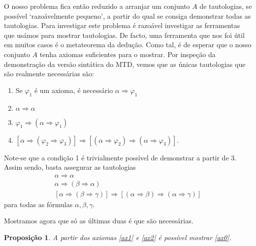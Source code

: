 \documentclass{report}
\newtheorem{prop}{Proposição}
\theoremstyle{definition}
\theoremstyle{remark}
\newcommand{\imply}{\mathbin{\Rightarrow}}
\begin{document}
	O nosso problema fica então reduzido a arranjar um conjunto $A$ de tautologias, se possível `razoávelmente pequeno', a partir do qual se consiga demonstrar todas as tautologias. Para investigar este problema é razoável investigar as ferramentas que usámos para mostrar tautologias. De facto, uma ferramenta que nos foi útil em muitos casos é o metateorema da dedução. Como tal, é de esperar que o nosso conjunto $A$ tenha axiomas suficientes para o mostrar. Por inspeção da demonstração da versão sintática do MTD, vemos que as únicas tautologias que são realmente necessárias são:
	
	\begin{enumerate}
	\item Se $\varphi_1$ é um axioma, é necessário $\alpha \imply \varphi_1$
	
	\item $\alpha \imply \alpha$
	
	\item $\varphi_1 \imply (\alpha \imply \varphi_1)$
	
	\item $[\alpha \imply (\varphi_2 \imply \varphi_3)] \imply [(\alpha \imply \varphi_2) \imply (\alpha \imply \varphi_3)]$.
	\end{enumerate}
	
	Note-se que a condição 1 é trivialmente possível de demonstrar a partir de 3. Assim sendo, basta assegurar as tautologias
	\begin{gather}
	\alpha \imply \alpha\label{ax0}\\
	\alpha \imply (\beta \imply \alpha)\label{ax1}\\
	[\alpha \imply (\beta \imply \gamma)] \imply [(\alpha \imply \beta) \imply (\alpha \imply \gamma)]\label{ax2}
	\end{gather}
	para todas as fórmulas $\alpha, \beta, \gamma$.
	
	Mostramos agora que só as últimas duas é que são necessárias.
	
	\begin{prop}
	A partir dos axiomas \eqref{ax1} e \eqref{ax2} é possível mostrar \eqref{ax0}.
	\end{prop}
	
\end{document}
